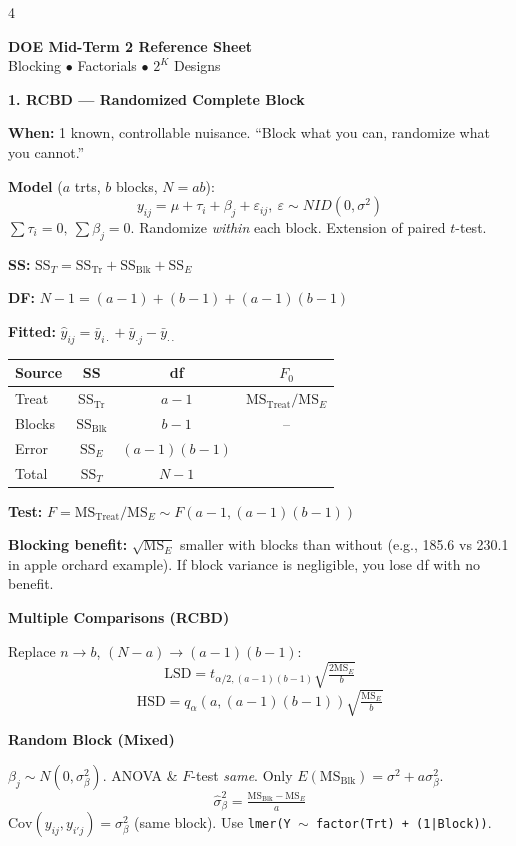 \documentclass[7pt,letterpaper,landscape]{extarticle}
\newcommand{\secbar}[1]{%
  \vspace{2pt}%
  {\colorbox{black!80}{\parbox{\dimexpr\linewidth-2\fboxsep}{\color{white}\small\bfseries #1}}}\par%
  \vspace{1pt}%
}
\newcommand{\subsec}[1]{\vspace{1pt}\textbf{\small #1}\par}
\newcommand{\MSE}{\mathrm{MS}_E}
\newcommand{\MST}{\mathrm{MS}_{\text{Treat}}}
\newcommand{\SSE}{\mathrm{SS}_E}
\newcommand{\SST}{\mathrm{SS}_T}
\newcommand{\SSB}{\mathrm{SS}_{\text{Blk}}}
\newcommand{\ybar}{\bar{y}}
\begin{document}
\begin{multicols*}{4}

\begin{center}
\textbf{\normalsize DOE Mid-Term 2 Reference Sheet}\\[-1pt]
{\footnotesize Blocking $\bullet$ Factorials $\bullet$ $2^K$ Designs}
\end{center}

\secbar{1. RCBD — Randomized Complete Block}
\textbf{When:} 1 known, controllable nuisance. ``Block what you can, randomize what you cannot.''

\textbf{Model} ($a$ trts, $b$ blocks, $N=ab$):
\[y_{ij}=\mu+\tau_i+\beta_j+\varepsilon_{ij},\ \varepsilon\sim NID(0,\sigma^2)\]
$\sum\tau_i{=}0,\ \sum\beta_j{=}0$. Randomize \emph{within} each block. Extension of paired $t$-test.

\textbf{SS:} $\SST{=}\mathrm{SS}_{\text{Tr}}{+}\SSB{+}\SSE$

\textbf{DF:} $N{-}1{=}(a{-}1){+}(b{-}1){+}(a{-}1)(b{-}1)$

\textbf{Fitted:} $\hat y_{ij}=\ybar_{i\cdot}+\ybar_{\cdot j}-\ybar_{\cdot\cdot}$

{\scriptsize
\begin{tabular}{@{}lccc@{}}
\toprule
Source & SS & df & $F_0$\\
\midrule
Treat & SS$_{\text{Tr}}$ & $a{-}1$ & $\MST/\MSE$\\
Blocks & $\SSB$ & $b{-}1$ & --\\
Error & $\SSE$ & $(a{-}1)(b{-}1)$ & \\
Total & $\SST$ & $N{-}1$ & \\
\bottomrule
\end{tabular}\par}

\textbf{Test:} $F{=}\MST/\MSE\sim F(a{-}1,(a{-}1)(b{-}1))$

\textbf{Blocking benefit:} $\sqrt{\MSE}$ smaller with blocks than without (e.g., 185.6 vs 230.1 in apple orchard example). If block variance is negligible, you lose df with no benefit.

\subsec{Multiple Comparisons (RCBD)}
Replace $n\to b$, $(N{-}a)\to(a{-}1)(b{-}1)$:
\[\text{LSD}{=}t_{\alpha/2,(a-1)(b-1)}\sqrt{\tfrac{2\MSE}{b}}\]
\[\text{HSD}{=}q_\alpha(a,(a{-}1)(b{-}1))\sqrt{\tfrac{\MSE}{b}}\]

\subsec{Random Block (Mixed)}
$\beta_j\sim N(0,\sigma_\beta^2)$. ANOVA \& $F$-test \emph{same}. Only $E(\mathrm{MS}_{\text{Blk}}){=}\sigma^2{+}a\sigma_\beta^2$.
\[\hat\sigma_\beta^2{=}\tfrac{\mathrm{MS}_{\text{Blk}}-\MSE}{a}\]
$\mathrm{Cov}(y_{ij},y_{i'j}){=}\sigma_\beta^2$ (same block).
Use \texttt{lmer(Y $\sim$ factor(Trt) + (1|Block))}.


\end{multicols*}
\end{document}
